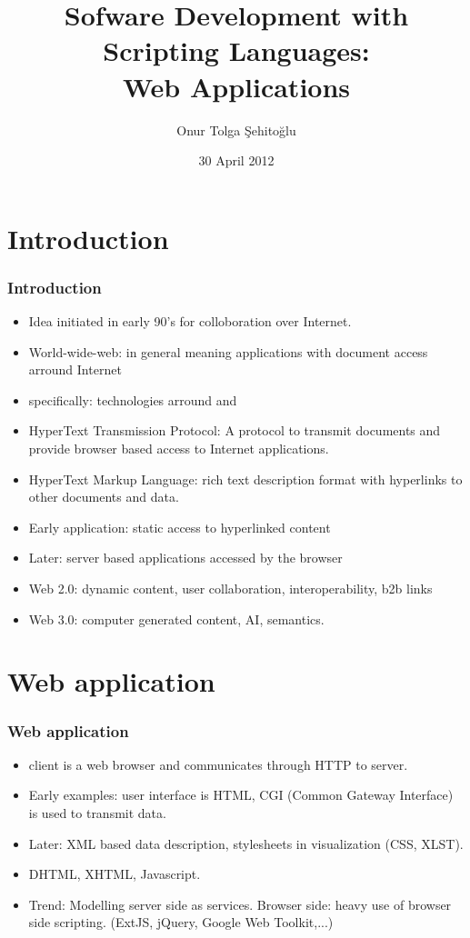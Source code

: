 \documentclass[trans,compress,xcolor=table]{beamer}
\title{Sofware Development with Scripting Languages:\\Web Applications}
\author{Onur Tolga Şehitoğlu}
\institute{Computer Engineering,METU}
\date{30 April 2012}
\begin{document}

%


 \frame{\maketitle}

 \frame{\tableofcontents}

\section{Introduction}
\begin{frame}
\frametitle{Introduction}
\begin{itemize}
\item Idea initiated in early 90's for colloboration over Internet.
\item World-wide-web: in general meaning applications with document access arround Internet
\item specifically: technologies arround  and 
\item HyperText Transmission Protocol: A protocol to transmit documents
	and provide browser based access to Internet applications.
\item HyperText Markup Language: rich text description format with hyperlinks to
	other documents and data.
\item Early application: static access to hyperlinked content 
\item Later: server based applications accessed by the browser
\item Web 2.0: dynamic content, user collaboration, interoperability, b2b links
\item Web 3.0: computer generated content, AI, semantics.
\end{itemize}
\end{frame}

\section{Web application}
\begin{frame}
\frametitle{Web application}
\begin{itemize}
\item client is a web browser and communicates through HTTP to server.
\item Early examples: user interface is HTML, CGI (Common Gateway Interface) is
	used to transmit data.
\item Later: XML based data description, stylesheets in visualization (CSS, XLST).
\item DHTML,  XHTML, Javascript.
\item Trend: Modelling server side as services. Browser side: heavy use of browser
	side scripting. (ExtJS, jQuery, Google Web Toolkit,...)
\end{itemize}
\end{frame}
\end{document}
